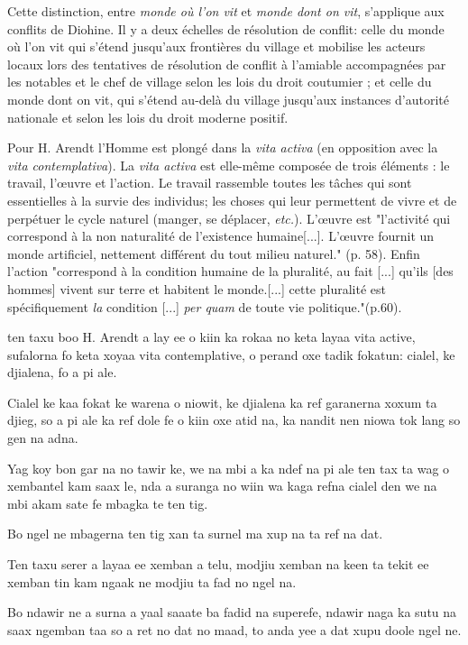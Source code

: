 \begin{paracol}{2}
  Cette distinction, entre \textit{monde où l'on vit} et \textit{monde dont on vit}, s'applique aux conflits de Diohine. Il y a deux échelles de résolution de conflit:  celle du monde où l'on vit qui s'étend jusqu'aux frontières du village et mobilise les acteurs locaux lors des tentatives de résolution de conflit à l'amiable accompagnées par les notables et le chef de village selon les lois du droit coutumier ; et celle du monde dont on vit, qui s'étend au-delà du village jusqu'aux instances d'autorité nationale et selon les lois du droit moderne positif.

  Pour H. Arendt\cite{arendt_condition_2020} l'Homme est plongé dans la \textit{vita activa} (en opposition avec la \textit{vita contemplativa}). La \textit{vita activa} est elle-même composée de trois éléments : le travail, l'\oe{}uvre et l'action. Le travail rassemble toutes les tâches qui sont essentielles à la survie des individus; les choses qui leur permettent de vivre et de perpétuer le cycle naturel (manger, se déplacer, \textit{etc.}). L'\oe{}uvre est "l'activité qui correspond à la non naturalité de l'existence humaine[...]. L'\oe{}uvre fournit un monde artificiel, nettement différent du tout milieu naturel." (p. 58). Enfin l'action "correspond à la condition humaine de la pluralité, au fait [...] qu'ils [des hommes] vivent sur terre et habitent le monde.[...] cette pluralité est spécifiquement \textit{la} condition [...] \textit{per quam} de toute vie politique."(p.60).

  \switchcolumn %

  ten taxu boo H. Arendt a lay ee o kiin ka rokaa no keta layaa vita active, sufalorna fo keta xoyaa vita contemplative, o perand oxe tadik fokatun: cialel, ke djialena, fo a pi ale.

  Cialel ke kaa fokat ke warena o niowit, ke djialena ka ref garanerna xoxum ta djieg, so a pi ale ka ref dole fe o kiin oxe atid na, ka nandit nen niowa tok lang so gen na adna.

  Yag koy bon gar na no tawir ke, we na mbi a ka ndef na pi ale ten tax ta wag o xembantel kam saax le, nda a suranga no wiin wa kaga refna cialel den we na mbi akam sate fe mbagka te ten tig.

  Bo ngel ne mbagerna ten tig xan ta surnel ma xup na ta ref na dat.

  Ten taxu serer a layaa ee xemban a telu, modjiu xemban na keen ta tekit ee xemban tin kam ngaak ne modjiu ta fad no ngel na.

  Bo ndawir ne a surna a yaal saaate ba fadid na superefe, ndawir naga ka sutu na saax ngemban taa so a ret no dat no maad, to anda yee a dat xupu doole ngel ne.


\end{paracol}
